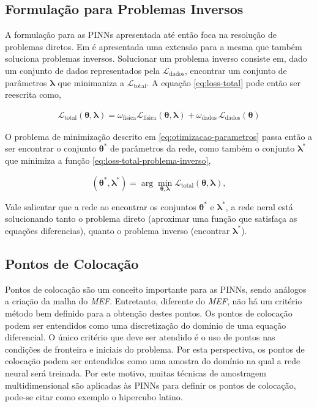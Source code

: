 \subsection{Formulação para Problemas Inversos}

A formulação para as PINNs apresentada até então foca na resolução de problemas
diretos. Em \cite{raissi-etal:19} é apresentada uma extensão para a mesma que 
também soluciona problemas inversos. Solucionar um problema inverso consiste em,
dado um conjunto de dados representados pela $\mathcal{L}_{\text{dados}}$,
encontrar um conjunto de parâmetros $\boldsymbol{\lambda}$ que minimaniza a
$\mathcal{L}_{\text{total}}$.
A equação \ref{eq:loss-total} pode então ser reescrita como,

\begin{eqnarray}\label{eq:loss-total-problema-inverso} 
    \mathcal{L}_{\text{total}}(\boldsymbol{\theta}, \boldsymbol{\lambda}) 
    = \omega_{\text{física}} \mathcal{L}_{\text{física}}(\boldsymbol{\theta}, \boldsymbol{\lambda}) 
    + \omega_{\text{dados}} \,\mathcal{L}_{\text{dados}}(\boldsymbol{\theta})
\end{eqnarray}

O problema de minimização descrito em \ref{eq:otimizacao-parametros} passa 
então a ser encontrar o conjunto $\boldsymbol{\theta}^*$ de parâmetros da rede,
como também o conjunto $\boldsymbol{\lambda}^*$
que minimiza a função \ref{eq:loss-total-problema-inverso}, 

\begin{equation}\label{eq:otimizacao-parametros-problema-inverso}
   (\boldsymbol{\theta}^*, \boldsymbol{\lambda}^*) 
   = \arg \min_{\boldsymbol{\theta}, \boldsymbol{\lambda}} \mathcal{L}_{\text{total}}(\boldsymbol{\theta}, \boldsymbol{\lambda}), 
\end{equation}

Vale salientar que a rede ao encontrar os conjuntos $\boldsymbol{\theta}^*$
e $\boldsymbol{\lambda}^*$, a rede neral está solucionando tanto o problema
direto (aproximar uma função que satisfaça as equações diferencias), quanto o 
problema inverso (encontrar $\boldsymbol{\lambda}^*$). 

\subsection{Pontos de Colocação}

Pontos de colocação são um conceito importante para as PINNs, sendo análogos
a criação da malha do \textit{MEF}. Entretanto, diferente do \textit{MEF}, 
não há um critério método bem definido para a obtenção destes pontos. 
Os pontos de colocação podem ser entendidos como uma discretização do domínio
de uma equação diferencial. O único critério que deve ser atendido é o uso
de pontos nas condições de fronteira e iniciais do problema.
Por esta perspectiva, os pontos de colocação podem ser entendidos como uma 
amostra do domínio na qual a rede neural será treinada. 
Por este motivo, muitas técnicas de amostragem multidimensional são 
aplicadas às PINNs para definir os pontos de colocação, pode-se citar como 
exemplo o hipercubo latino.

